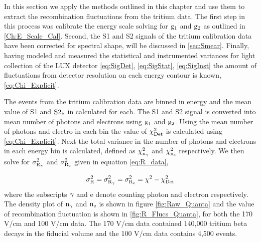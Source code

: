 In this section we apply the methods outlined in this chapter and use them to extract the recombination fluctuations from the tritium data. The first step in this process was calibrate the energy scale solving for $\rm g_1$ and $\rm g_2$ as outlined in \ref{Ch:E_Scale_Cal}. Second, the S1 and S2 signals of the tritium calibration data have been corrected for spectral shape, will be discussed in \ref{sec:Smear}. Finally, having modeled and measured the statistical and instrumented variances for light collection of the LUX detector \ref{eq:SigDet}, \ref{eq:SigStat}, \ref{eq:SigInst} the amount of fluctuations from detector resolution on each energy contour is known, \ref{eq:Chi_Explicit}. 

The events from the tritium calibration data are binned in energy and the mean value of S1 and $\rm S2_b$ in calculated for each. The S1 and S2 signal is converted into mean number of photons and electrons using $\rm g_1$ and $\rm g_2$. Using the mean number of photons and electro in each bin the value of $\rm \chi_{Det}^2$ is calculated using \ref{eq:Chi_Explicit}. Next the total variance in the number of photons and electrons in each energy bin is calculated, defined as $\rm \chi_{n_{\gamma}}^2$ and $\rm \chi_{n_{e}}^2$ respectively. We then solve for $\rm \sigma_{R_\gamma}^2$ and $\rm \sigma_{R_e}^2$ given in equation \ref{eq:R_data}, 

\begin{equation}
\rm \sigma_R^2 = \sigma_{R_\gamma}^2 = \sigma_{R_e}^2 = \chi^2-\chi_{Det}^2
\label{eq:R_data}
\end{equation}
\noindent where the subscripts $\rm \gamma$ and e denote counting photon and electron respectively. The density plot of $\rm n_\gamma$ and $\rm n_e$ is shown in figure \ref{fig:Raw_Quanta} and the value of recombination fluctuation is shown in \ref{fig:R_Flucs_Quanta}, for both the 170 V/cm and 100 V/cm data. The 170 V/cm data contained 140,000 tritium beta decays in the fiducial volume and the 100 V/cm data contains 4,500 events. 


